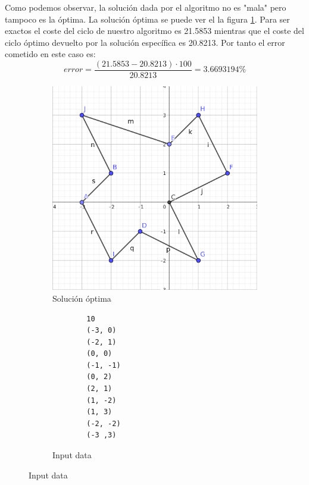 \documentclass{article}
\begin{document}
Como podemos observar, la solución dada por el algoritmo no es "mala" pero tampoco es la óptima. La solución óptima se puede ver el la figura \ref{fig:sol_optima}. Para ser exactos el coste del ciclo de nuestro algoritmo es 21.5853 mientras que el coste del ciclo óptimo devuelto por la solución específica es 20.8213. Por tanto el error cometido en este caso es: 
$$
error = \frac{(21.5853 - 20.8213) \cdot 100}{20.8213} = 3.6693194\%
$$

\begin{figure}
\centering
    \begin{subfigure}{0.3\textwidth}
        \centering
        \includegraphics[width=\textwidth]{P3/Prosa/ejemplo_optimo.png}
        \caption{\centering Solución óptima}
        \label{fig:sol_optima}
    \end{subfigure}
    \begin{subfigure}{0.3\textwidth}
    \begin{verbatim}
        10
        (-3, 0)
        (-2, 1)
        (0, 0)
        (-1, -1)
        (0, 2)
        (2, 1)
        (1, -2)
        (1, 3)
        (-2, -2)
        (-3 ,3)
    \end{verbatim}
    \caption{\centering Input data}
    \end{subfigure}
\end{figure}
\end{document}
